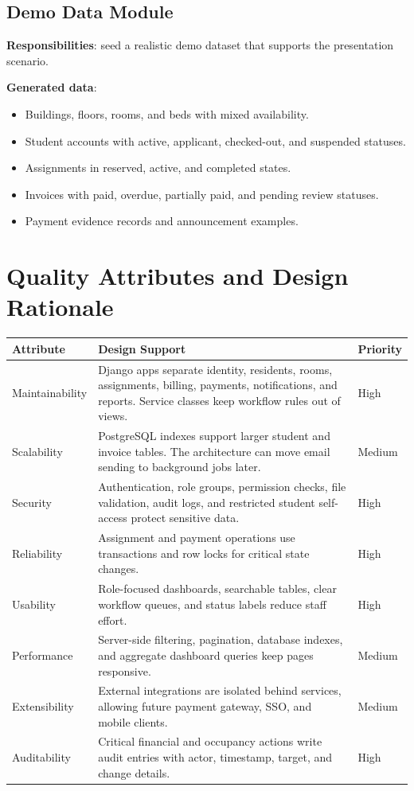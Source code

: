\documentclass[11pt,a4paper]{article}
\begin{document}
\subsection{Demo Data Module}
\textbf{Responsibilities}: seed a realistic demo dataset that supports the presentation scenario.

\textbf{Generated data}:
\begin{itemize}
  \item Buildings, floors, rooms, and beds with mixed availability.
  \item Student accounts with active, applicant, checked-out, and suspended statuses.
  \item Assignments in reserved, active, and completed states.
  \item Invoices with paid, overdue, partially paid, and pending review statuses.
  \item Payment evidence records and announcement examples.
\end{itemize}

\section{Quality Attributes and Design Rationale}

\begin{longtable}{L{0.18\textwidth} L{0.62\textwidth} L{0.12\textwidth}}
\toprule
\textbf{Attribute} & \textbf{Design Support} & \textbf{Priority}\\
\midrule
\endhead
Maintainability & Django apps separate identity, residents, rooms, assignments, billing, payments, notifications, and reports. Service classes keep workflow rules out of views. & High\\
Scalability & PostgreSQL indexes support larger student and invoice tables. The architecture can move email sending to background jobs later. & Medium\\
Security & Authentication, role groups, permission checks, file validation, audit logs, and restricted student self-access protect sensitive data. & High\\
Reliability & Assignment and payment operations use transactions and row locks for critical state changes. & High\\
Usability & Role-focused dashboards, searchable tables, clear workflow queues, and status labels reduce staff effort. & High\\
Performance & Server-side filtering, pagination, database indexes, and aggregate dashboard queries keep pages responsive. & Medium\\
Extensibility & External integrations are isolated behind services, allowing future payment gateway, SSO, and mobile clients. & Medium\\
Auditability & Critical financial and occupancy actions write audit entries with actor, timestamp, target, and change details. & High\\
\bottomrule
\end{longtable}
\end{document}

